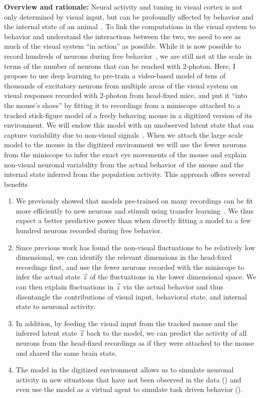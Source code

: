 \documentclass[B2,COG]{ercgrant}
\begin{document}
\textbf{Overview and rationale:} Neural activity and tuning in visual cortex is not only determined by visual input, but can be profoundly affected by behavior and the internal state of an animal~\parencite{Niell2010-bs,Musall2019-kd,Stringer2019-lt, Franke2022-do}.
To link the computations in the visual system to behavior and understand the interactions between the two, we need to see as much of the visual system ``in action'' as possible. 
While it is now possible to record hundreds of neurons during free behavior~\parencite{Parker2022-ac}, we are still not at the scale in terms of the number of neurons that can be reached with 2-photon. 
Here, I propose to use deep learning to pre-train a video-based model of tens of thousands of excitatory neurons from multiple areas of the visual system on visual responses recorded with 2-photon from head-fixed mice, and put it ``into the mouse's shoes'' by fitting it to recordings from a miniscope attached to a tracked stick-figure model of a freely behaving mouse in a  digitized version of its environment.
We will endow this model with an unobserved latent state that can capture variability due to non-visual signals~\parencite{Musall2019-kd, Bashiri2021-or}.
When we attach the large scale model to the mouse in the digitized environment we will use the fewer neurons from the miniscope to infer the exact eye movements of the mouse and explain non-visual neuronal variability from the actual behavior of the mouse and the internal state inferred from the population activity.
This approach offers several benefits
\begin{enumerate}[topsep=0pt,itemsep=0.62ex,partopsep=0ex,parsep=0.5ex]
    \item We previously showed that models pre-trained on many recordings can be fit more efficiently to new neurons and stimuli using transfer learning~\parencite{Lurz2020-ua}. We thus expect a better predictive power than when directly fitting a model to a few hundred neurons recorded during free behavior. 
    \item Since previous work has found the non-visual fluctuations to be relatively low dimensional, we can identify the relevant dimensions in the head-fixed recordings first, and use the fewer neurons recorded with the miniscope to infer the actual state $\vec{z}$ of the fluctuations in the lower dimensional space. We can then explain fluctuations in $\vec{z}$ via the actual behavior and thus disentangle the contributions of visual input, behavioral state, and internal state to neuronal activity. 
    \item In addition, by feeding the visual input from the tracked mouse and the inferred latent state $\vec{z}$ back to the model, we can predict the activity of all neurons from the head-fixed recordings as if they were attached to the mouse and shared the same brain state.
    \item The model in the digitized environment allows us to simulate neuronal activity in new situations that have not been observed in the data (\objii) and even use the model as a virtual agent to simulate task driven behavior (\objiii).
\end{enumerate}
\end{document}
